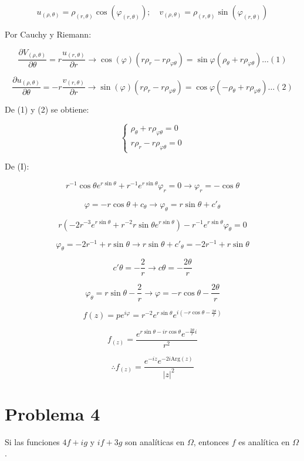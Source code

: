 \documentclass[a4paper,12pt]{article}
\begin{document}
\[
u_{(\rho,\theta)} = \rho_{(r,\theta)} \cos(\varphi_{(r,\theta)}) ; \quad v_{(\rho,\theta)} = \rho_{(r,\theta)} \sin(\varphi_{(r,\theta)})
\]

Por Cauchy y Riemann:

\[
\frac{\partial V_{(\rho,\theta)}}{\partial \theta} = r\frac{u_{(r,\theta)}}{\partial r} \rightarrow \cos(\varphi)(r \rho_r - r \rho_{\varphi \theta}) = \sin \varphi (\rho_\theta + r \rho_{\varphi \theta}) \ldots (1)
\]

\[
\frac{\partial u_{(\rho,\theta)}}{\partial \theta} = -r \frac{v_{(r,\theta)}}{\partial r} \rightarrow \sin(\varphi)(r \rho_r - r \rho_{\varphi \theta}) = \cos \varphi (- \rho_\theta + r \rho_{\varphi \theta}) \ldots (2)
\]

De (1) y (2) se obtiene:

\[
\begin{cases}
\rho_\theta + r \rho_{\varphi \theta} = 0 \\
r \rho_r - r \rho_{\varphi \theta} = 0
\end{cases}
\]

De (I):

\[
r^{-1}\cos\theta e^{r \sin \theta} + r^{-1}e^{r \sin \theta} \varphi_r = 0 \rightarrow \varphi_r = -\cos\theta
\]

\[
\varphi = -r \cos \theta + c_\theta \rightarrow \varphi_\theta = r \sin \theta + c'_\theta
\]

\[
r(-2r^{-3}e^{r \sin \theta} + r^{-2}r \sin \theta e^{r \sin \theta}) - r^{-1}e^{r \sin \theta} \varphi_\theta = 0
\]

\[
\varphi_\theta = -2r^{-1} + r \sin \theta \rightarrow r \sin \theta + c'_\theta = -2r^{-1} + r \sin \theta
\]

\[
c'\theta = -\frac{2}{r} \rightarrow c\theta = -\frac{2\theta}{r}
\]

\[
\varphi_\theta = r \sin \theta - \frac{2}{r} \rightarrow \varphi = -r \cos \theta - \frac{2\theta}{r}
\]

\[
f(z) = pe^{i\varphi} = r^{-2}e^{r \sin \theta} e^{i(-r \cos \theta - \frac{2\theta}{r})}
\]

\[
f_{(z)} = \frac{e^{r \sin \theta - ir \cos \theta} e^{-\frac{2\theta}{r}i}}{r^2}
\]

\[
\therefore f_{(z)} = \frac{e^{-iz} e^{-2i \text{Arg}(z)}}{|z|^2}
\]

\section*{Problema 4}
Si las funciones \( 4f + ig \) y \( if + 3g \) son analíticas en \(\Omega\), entonces \( f \) es analítica en \(\Omega\).
\end{document}
